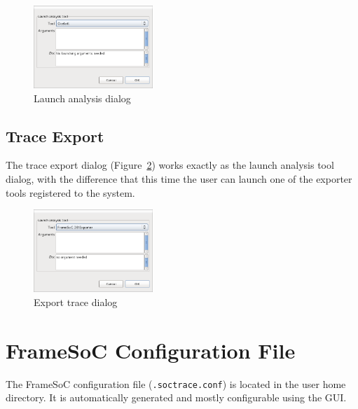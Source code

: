 \documentclass[twoside]{article}
\begin{document}
\begin{sloppypar}
\begin{figure}[h!]
  \centering
    \includegraphics[width=0.4\textwidth]{images/analysis_dialog.png}
  \caption{Launch analysis dialog}
  \label{fig:analysis_dialog}
\end{figure}

\subsection{Trace Export }
\label{subsec:export}

The  trace export dialog (Figure~\ref{fig:export_dialog}) works exactly as the launch analysis tool dialog, with the difference that this time the user can launch one of the exporter tools registered to the system.

\begin{figure}[h!]
  \centering
    \includegraphics[width=0.4\textwidth]{images/export_dialog.png}
  \caption{Export trace dialog}
  \label{fig:export_dialog}
\end{figure}

\newpage

\appendix

\section{FrameSoC Configuration File}
\label{app:conf}

The FrameSoC configuration file (\texttt{.soctrace.conf}) is located in the user home directory.
It is automatically generated and mostly configurable using the GUI.


\end{sloppypar}
\end{document}
